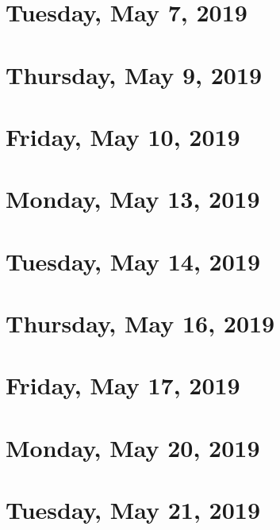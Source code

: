 \documentclass[reqno]{amsart}
\begin{document}
\section{Tuesday, May 7, 2019}
    
\section{Thursday, May 9, 2019}
    
\section{Friday, May 10, 2019}
    
    
\section{Monday, May 13, 2019}
    
\section{Tuesday, May 14, 2019}
    
\section{Thursday, May 16, 2019}
    
\section{Friday, May 17, 2019}
    

\section{Monday, May 20, 2019}
    
\section{Tuesday, May 21, 2019}
    
\end{document}
